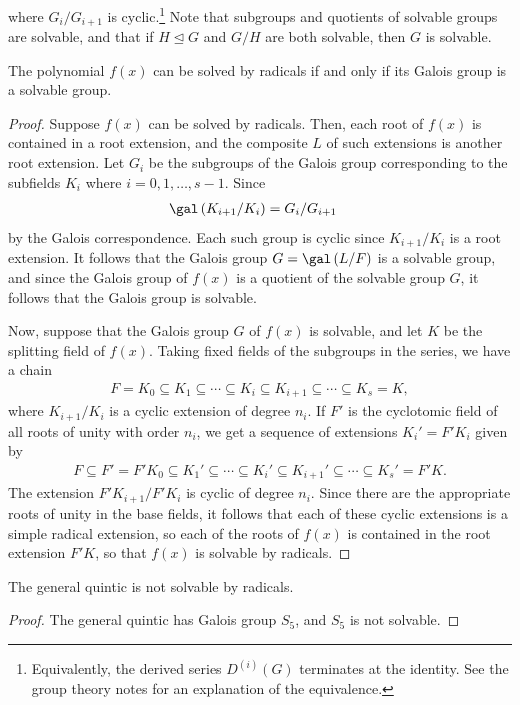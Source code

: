 \documentclass[10pt]{mypackage}
\begin{document}
where $G_i/G_{i+1}$ is cyclic.\footnote{Equivalently, the derived series $D^{(i)}(G)$ terminates at the identity. See the group theory notes for an explanation of the equivalence.} Note that subgroups and quotients of solvable groups are solvable, and that if $H\trianglelefteq G$ and $G/H$ are both solvable, then $G$ is solvable.
\begin{theorem}
  The polynomial $f(x)$ can be solved by radicals if and only if its Galois group is a solvable group.
\end{theorem}
\begin{proof}
  Suppose $f(x)$ can be solved by radicals. Then, each root of $f(x)$ is contained in a root extension, and the composite $L$ of such extensions is another root extension. Let $G_i$ be the subgroups of the Galois group corresponding to the subfields $K_i$ where $i = 0,1,\dots,s-1$. Since
  \begin{align*}
    \gal\left( K_{i+1}/K_i \right) &= G_i/G_{i+1}
  \end{align*}
  by the Galois correspondence. Each such group is cyclic since $K_{i+1}/K_i$ is a root extension. It follows that the Galois group $G = \gal\left( L/F \right)$ is a solvable group, and since the Galois group of $f(x)$ is a quotient of the solvable group $G$, it follows that the Galois group is solvable.

  Now, suppose that the Galois group $G$ of $f(x)$ is solvable, and let $K$ be the splitting field of $f(x)$. Taking fixed fields of the subgroups in the series, we have a chain
  \begin{align*}
    F = K_0\subseteq K_1\subseteq\cdots\subseteq K_{i}\subseteq K_{i+1}\subseteq\cdots\subseteq K_s = K,
  \end{align*}
  where $K_{i+1}/K_i$ is a cyclic extension of degree $n_i$. If $F'$ is the cyclotomic field of all roots of unity with order $n_i$, we get a sequence of extensions $K_i' = F'K_i$ given by
  \begin{align*}
    F\subseteq F'=F'K_0\subseteq K_1'\subseteq\cdots\subseteq K_i'\subseteq K_{i+1}'\subseteq\cdots\subseteq K_s'=F'K.
  \end{align*}
  The extension $F'K_{i+1}/F'K_i$ is cyclic of degree $n_i$. Since there are the appropriate roots of unity in the base fields, it follows that each of these cyclic extensions is a simple radical extension, so each of the roots of $f(x)$ is contained in the root extension $F'K$, so that $f(x)$ is solvable by radicals.
\end{proof}
\begin{theorem}
  The general quintic is not solvable by radicals.
\end{theorem}
\begin{proof}
  The general quintic has Galois group $S_5$, and $S_5$ is not solvable.
\end{proof}
\end{document}
